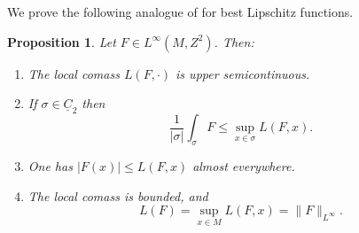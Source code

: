 \documentclass[reqno,11pt]{amsart}
\newcommand*\dif{\mathop{}\!\mathrm{d}}
\newcommand{\Chain}{\underline C}
\newtheorem{proposition}[theorem]{Proposition}
\theoremstyle{definition}
\numberwithin{equation}{section}
\begin{document}
We prove the following analogue of \cite[Lemma 4.2]{Crandall2008} for best Lipschitz functions.

\begin{proposition}\label{crandall}
Let $F \in L^\infty(M, Z^2)$. Then:
\begin{enumerate}
\item The local comass $L(F, \cdot)$ is upper semicontinuous. \label{crandall usc}
\item If $\sigma \in \Chain_2$ then \label{crandall best curl is ABC}
$$\frac{1}{|\sigma|} \int_\sigma F \leq \sup_{x \in \sigma} L(F, x).$$
\item One has $|F(x)| \leq L(F, x)$ almost everywhere. \label{crandall LDT}
\item The local comass is bounded, and \label{crandall linfinity}
$$L(F) = \sup_{x \in M} L(F, x) = \|F\|_{L^\infty}.$$
\end{enumerate}
\end{proposition}
\end{document}
